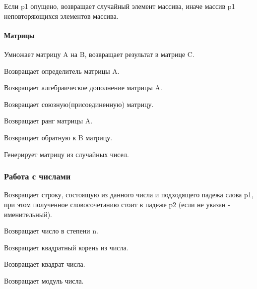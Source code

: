 \hypertarget{iz}{}

Если p1 опущено, возвращает случайный элемент массива, иначе массив p1 неповторяющихся элементов массива.

\paragraph*{Матрицы}


Умножает матрицу A на B, возвращает результат в матрице C.


Возвращает определитель матрицы A.


Возвращает алгебраическое дополнение матрицы A.


Возвращает союзную(присоединенную) матрицу.


Возвращает ранг матрицы A.


Возвращает обратную  к B матрицу.


Генерирует матрицу из случайных чисел.

\subsubsection*{Работа с числами}

\hypertarget{chislitlx}{}

Возвращает строку, состоящую из данного числа и подходящего падежа слова p1, при этом
полученное словосочетанию стоит в падеже p2 (если не указан - именительный).


Возвращает число в степени n.


Возвращает квадратный корень из числа.


Возвращает квадрат числа.


Возвращает модуль числа.

